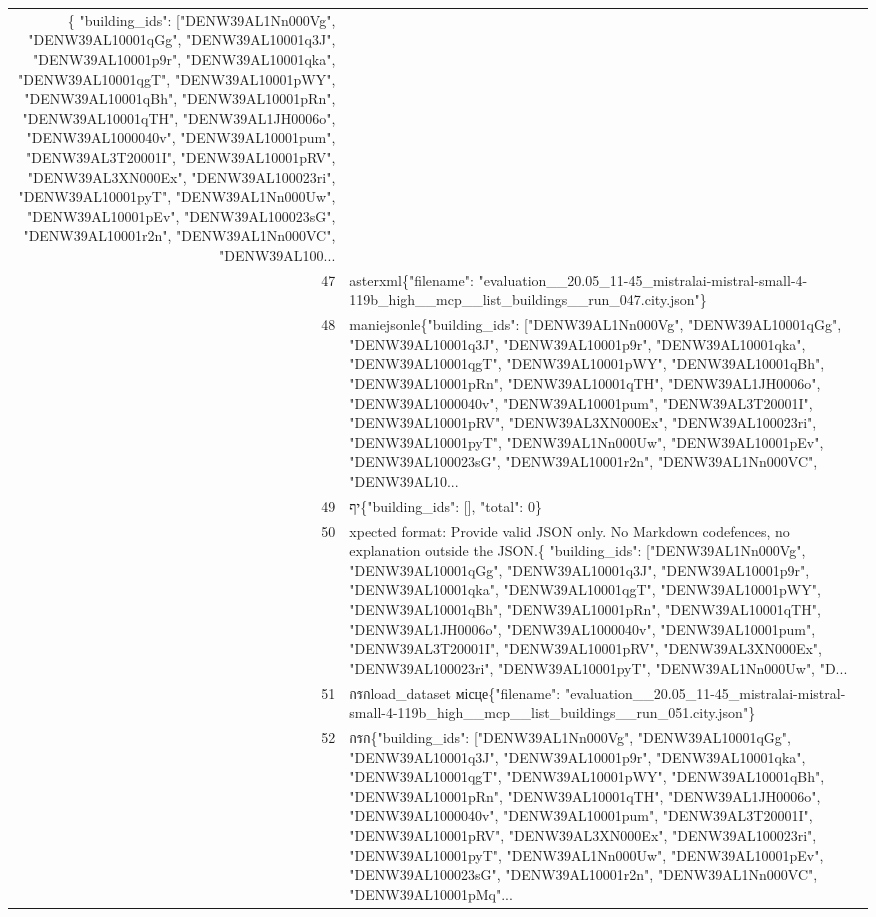 \documentclass[a4paper,11pt]{article}
\begin{document}
\begin{table}[ht]
\begin{tabular}{r p{12cm}}
\{
  "building\_ids": ["DENW39AL1Nn000Vg", "DENW39AL10001qGg", "DENW39AL10001q3J", "DENW39AL10001p9r", "DENW39AL10001qka", "DENW39AL10001qgT", "DENW39AL10001pWY", "DENW39AL10001qBh", "DENW39AL10001pRn", "DENW39AL10001qTH", "DENW39AL1JH0006o", "DENW39AL1000040v", "DENW39AL10001pum", "DENW39AL3T20001I", "DENW39AL10001pRV", "DENW39AL3XN000Ex", "DENW39AL100023ri", "DENW39AL10001pyT", "DENW39AL1Nn000Uw", "DENW39AL10001pEv", "DENW39AL100023sG", "DENW39AL10001r2n", "DENW39AL1Nn000VC", "DENW39AL100... \\
47 & asterxml\{"filename": "evaluation\_\_20.05\_11-45\_mistralai-mistral-small-4-119b\_high\_\_mcp\_\_list\_buildings\_\_run\_047.city.json"\} \\
48 & maniejsonle\{"building\_ids": ["DENW39AL1Nn000Vg", "DENW39AL10001qGg", "DENW39AL10001q3J", "DENW39AL10001p9r", "DENW39AL10001qka", "DENW39AL10001qgT", "DENW39AL10001pWY", "DENW39AL10001qBh", "DENW39AL10001pRn", "DENW39AL10001qTH", "DENW39AL1JH0006o", "DENW39AL1000040v", "DENW39AL10001pum", "DENW39AL3T20001I", "DENW39AL10001pRV", "DENW39AL3XN000Ex", "DENW39AL100023ri", "DENW39AL10001pyT", "DENW39AL1Nn000Uw", "DENW39AL10001pEv", "DENW39AL100023sG", "DENW39AL10001r2n", "DENW39AL1Nn000VC", "DENW39AL10... \\
49 & יף\{"building\_ids": [], "total": 0\} \\
50 & xpected format: Provide valid JSON only. No Markdown codefences, no explanation outside the JSON.\{
  "building\_ids": ["DENW39AL1Nn000Vg", "DENW39AL10001qGg", "DENW39AL10001q3J", "DENW39AL10001p9r", "DENW39AL10001qka", "DENW39AL10001qgT", "DENW39AL10001pWY", "DENW39AL10001qBh", "DENW39AL10001pRn", "DENW39AL10001qTH", "DENW39AL1JH0006o", "DENW39AL1000040v", "DENW39AL10001pum", "DENW39AL3T20001I", "DENW39AL10001pRV", "DENW39AL3XN000Ex", "DENW39AL100023ri", "DENW39AL10001pyT", "DENW39AL1Nn000Uw", "D... \\
51 &  กรกload\_dataset місце\{"filename": "evaluation\_\_20.05\_11-45\_mistralai-mistral-small-4-119b\_high\_\_mcp\_\_list\_buildings\_\_run\_051.city.json"\} \\
52 &  กรก\{"building\_ids": ["DENW39AL1Nn000Vg", "DENW39AL10001qGg", "DENW39AL10001q3J", "DENW39AL10001p9r", "DENW39AL10001qka", "DENW39AL10001qgT", "DENW39AL10001pWY", "DENW39AL10001qBh", "DENW39AL10001pRn", "DENW39AL10001qTH", "DENW39AL1JH0006o", "DENW39AL1000040v", "DENW39AL10001pum", "DENW39AL3T20001I", "DENW39AL10001pRV", "DENW39AL3XN000Ex", "DENW39AL100023ri", "DENW39AL10001pyT", "DENW39AL1Nn000Uw", "DENW39AL10001pEv", "DENW39AL100023sG", "DENW39AL10001r2n", "DENW39AL1Nn000VC", "DENW39AL10001pMq"... \\

\end{tabular}
\end{table}
\end{document}
